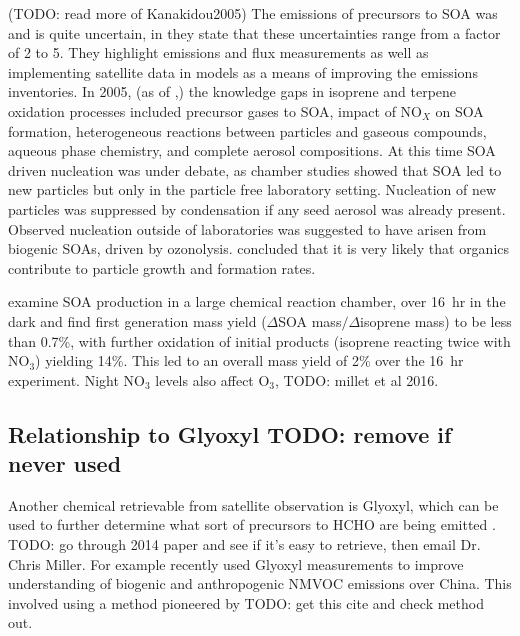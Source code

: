     (TODO: read more of Kanakidou2005)
    The emissions of precursors to SOA was and is quite uncertain, in \cite{Kanakidou2005} they state that these uncertainties range from a factor of 2 to 5.
    They highlight emissions and flux measurements as well as implementing satellite data in models as a means of improving the emissions inventories.
    In 2005, (as of \cite{Kanakidou2005},) the knowledge gaps in isoprene and terpene oxidation processes included precursor gases to SOA, impact of NO$_X$ on SOA formation, heterogeneous reactions between particles and gaseous compounds, aqueous phase chemistry, and complete aerosol compositions.
    At this time SOA driven nucleation was under debate, as chamber studies showed that SOA led to new particles but only in the particle free laboratory setting. 
    Nucleation of new particles was suppressed by condensation if any seed aerosol was already present.
    Observed nucleation outside of laboratories was suggested to have arisen from biogenic SOAs, driven by ozonolysis.
    \cite{Kanakidou2005} concluded that it is very likely that organics contribute to particle growth and formation rates.
    
    \cite{Rollins2009} examine SOA production in a large chemical reaction chamber, over 16~hr in the dark and find first generation mass yield ($\Delta$SOA mass$/\Delta$isoprene mass) to be less than 0.7\%, with further oxidation of initial products (isoprene reacting twice with NO$_3$) yielding 14\%.
    This led to an overall mass yield of 2\% over the 16~hr experiment.
    Night NO$_3$ levels also affect O$_3$, TODO: millet et al 2016. %
    
  \subsection{Relationship to Glyoxyl TODO: remove if never used}
    
    Another chemical retrievable from satellite observation is Glyoxyl, which can be used to further determine what sort of precursors to HCHO are being emitted \citep{Stavrakou2009, Miller2014, Miller2017}.
    TODO: go through 2014 paper and see if it's easy to retrieve, then email Dr. Chris Miller.
    For example \cite{Cao2018_discuss} recently used Glyoxyl measurements to improve understanding of biogenic and anthropogenic NMVOC emissions over China.
    This involved using a method pioneered by \cite{Stavrakou2009} TODO: get this cite and check method out.
    

